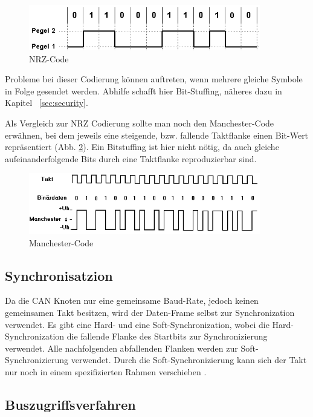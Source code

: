 \begin{figure}[h] 
\centering
\includegraphics[width=0.9\textwidth]{figures/nrzcode}
\caption{NRZ-Code \citep{NRZ}} 
\label{nrzcode}
\end{figure} 

Probleme bei dieser Codierung können auftreten, wenn mehrere gleiche Symbole in Folge
gesendet werden. Abhilfe schafft hier Bit-Stuffing, näheres dazu in Kapitel ~\ref{sec:security}.

Als Vergleich zur NRZ Codierung sollte man noch den Manchester-Code erwähnen, bei dem
jeweils eine steigende, bzw. fallende Taktflanke einen Bit-Wert repräsentiert (Abb. \ref{mancode}).
Ein Bitstuffing ist hier nicht nötig, da auch gleiche aufeinanderfolgende Bits durch eine Taktflanke 
reproduzierbar sind.

\begin{figure}[h] 
\centering
\includegraphics[width=0.9\textwidth]{figures/mancode}
\caption{Manchester-Code \citep{MAN}} 
\label{mancode}
\end{figure} 
	
\subsection{Synchronisatzion}

Da die CAN Knoten nur eine gemeinsame Baud-Rate, jedoch keinen gemeinsamen Takt besitzen, 
wird der Daten-Frame selbst zur Synchronization verwendet. Es gibt eine Hard- und eine Soft-Synchronization,
wobei die Hard-Synchronization die fallende Flanke des Startbits zur Synchronizierung verwendet. Alle 
nachfolgenden abfallenden Flanken werden zur Soft-Synchronizierung verwendet. Durch die Soft-Synchronizierung
kann sich der Takt nur noch in einem spezifizierten Rahmen verschieben \citep[nach][]{BSY}.
	
\subsection{Buszugriffsverfahren}
\label{sec:access}

